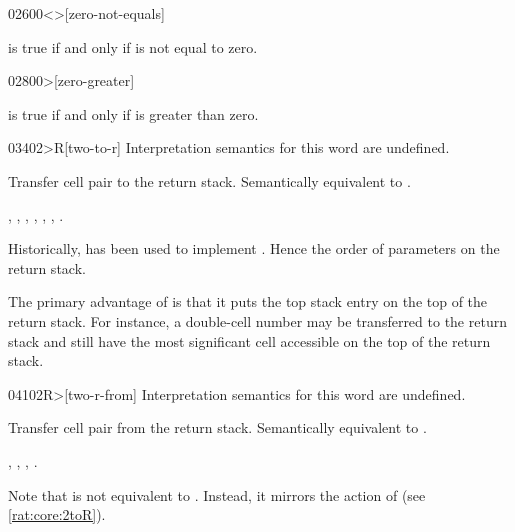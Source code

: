 \begin{worddef}[0ne]{0260}{0<>}[zero-not-equals]
\item {}

	 is true if and only if  is not equal to
	zero.
\end{worddef}


\begin{worddef}[0more]{0280}{0>}[zero-greater]
\item {}

	 is true if and only if  is greater than
	zero.
\end{worddef}


\begin{worddef}[2toR]{0340}{2>R}[two-to-r]
\interpret
	Interpretation semantics for this word are undefined.

\execute

	Transfer cell pair  to the return stack.
	Semantically equivalent to   .

\see {},
	,
	,
	,
	,
	,
	.

	\begin{rationale} %
		Historically,  has been used to implement .
		Hence the order of parameters on the return stack.

		The primary advantage of  is that it puts the top
		stack entry on the top of the return stack. For instance, a
		double-cell number may be transferred to the return stack and
		still have the most significant cell accessible on the top of
		the return stack.
	\end{rationale}
\end{worddef}


\begin{worddef}[2Rfrom]{0410}{2R>}[two-r-from]
\interpret
	Interpretation semantics for this word are undefined.

\execute

	Transfer cell pair  from the return stack.
	Semantically equivalent to   .

\see {},
	,
	,
	.

	\begin{rationale} %
		Note that  is not equivalent to  .
		Instead, it mirrors the action of 
		(see \ref{rat:core:2toR}).
	\end{rationale}
\end{worddef}


